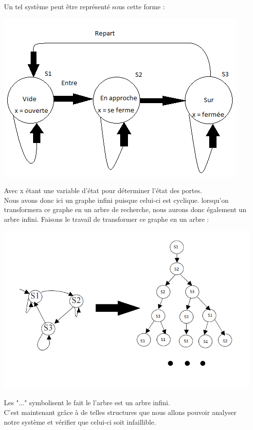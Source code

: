 \documentclass[11pt,a4paper]{article}
\begin{document}
\noindent Un tel système peut être représenté sous cette forme :  

\includegraphics[scale=1]{graphe.png}

\noindent Avec x étant une variable d'état pour déterminer l'état des portes.\\

Nous avons donc ici un graphe infini puisque celui-ci est cyclique. lorsqu'on transformera ce graphe en un arbre de recherche, nous aurons donc également un arbre infini. Faisons le travail de transformer ce graphe en un arbre : 
\begin{center}
\includegraphics[scale=0.7]{kripke.png}
\end{center}

\noindent Les "..." symbolisent le fait le l'arbre est un arbre infini.\\

\noindent C'est maintenant grâce à de telles structures que nous allons pouvoir analyser notre système et vérifier que celui-ci soit infaillible.

 
\end{document}
